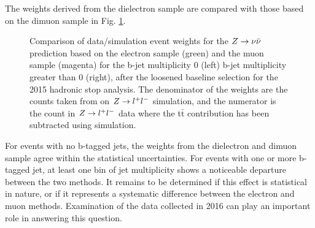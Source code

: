 The weights derived from the dielectron sample are compared with those based on the dimuon sample in Fig. \ref{fig:ZInvWeights}. 
\begin{figure}[tb!]
\centering
{}
\caption{Comparison of data/simulation event weights for the $Z\rightarrow \nu\bar{\nu}$ prediction based on the electron sample (green) and the muon sample (magenta) for the b-jet multiplicity 0 (left) b-jet multiplicity greater than 0 (right), after the loosened baseline selection for the 2015 hadronic stop analysis. The denominator of the weights are the counts taken from on $Z\rightarrow l^+l^-$ simulation, and the numerator is the count in $Z\rightarrow l^+l^-$ data where the t$\bar{\text{t}}$ contribution has been subtracted using simulation. }
\label{fig:ZInvWeights}
\end{figure}
For events with no b-tagged jets, the weights from the dielectron and dimuon sample agree within the statistical uncertainties. For events with one or more b-tagged jet, at least one bin of jet multiplicity shows a noticeable departure between the two methods. It remains to be determined if this effect is statistical in nature, or if it represents a systematic difference between the electron and muon methods. Examination of the data collected in 2016 can play an important role in answering this question.

